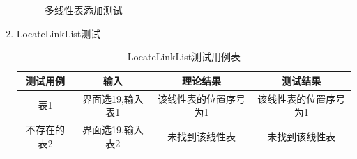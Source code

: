 \documentclass[supercite]{HustGraduPaper}
\theoremstyle{definition}
\begin{document}
\begin{enumerate}
\begin{figure}[htb]
		      \caption{多线性表添加测试}
	      \end{figure}
	      \newpage
	\item LocateLinkList测试
	      \begin{table}[htb]
		      \begin{center}
			      \setlength{\tabcolsep}{2.0mm}
			      \caption{LocateLinkList测试用例表}
			      \label{table20}
			      \begin{tabular}{|c|c|c|c|}
				      \hline
				      测试用例    & 输入             & 理论结果              & 测试结果              \\
				      \hline
				      \hline
				      表1         & 界面选19,输入表1 & 该线性表的位置序号为1 & 该线性表的位置序号为1 \\
				      \hline
				      不存在的表2 & 界面选19,输入表2 & 未找到该线性表        & 未找到该线性表        \\
				      \hline
			      \end{tabular}
		      \end{center}
	      \end{table}
	      \begin{figure}[htb]
		      \centering
		      \quad
		      \\

\end{figure}
\end{enumerate}
\end{document}
